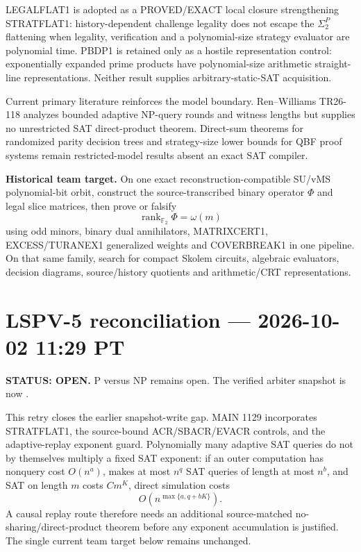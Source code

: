 \documentclass[11pt]{article}
\begin{document}
LEGALFLAT1 is adopted as a PROVED/EXACT local closure strengthening STRATFLAT1: history-dependent
challenge legality does not escape the \(\Sigma_2^P\) flattening when legality, verification and a
polynomial-size strategy evaluator are polynomial time. PBDP1 is retained only as a hostile
representation control: exponentially expanded prime products have polynomial-size arithmetic
straight-line representations. Neither result supplies arbitrary-static-SAT acquisition.

Current primary literature reinforces the model boundary. Ren--Williams TR26-118 analyzes bounded
adaptive NP-query rounds and witness lengths but supplies no unrestricted SAT direct-product theorem.
Direct-sum theorems for randomized parity decision trees and strategy-size lower bounds for QBF
proof systems remain restricted-model results absent an exact SAT compiler.

\begin{candidatebox}
\textbf{Historical team target.}
On one exact reconstruction-compatible SU/vMS polynomial-bit orbit, construct the source-transcribed
binary operator \(\Phi\) and legal slice matrices, then prove or falsify
\[
\operatorname{rank}_{\mathbb F_2}\Phi=\omega(m)
\]
using odd minors, binary dual annihilators, MATRIXCERT1, EXCESS/TURANEX1 generalized weights and
COVERBREAK1 in one pipeline. On that same family, search for compact Skolem circuits, algebraic
evaluators, decision diagrams, source/history quotients and arithmetic/CRT representations.
\end{candidatebox}

\section{LSPV-5 reconciliation --- 2026-10-02 11:29 PT}
\textbf{STATUS: OPEN.} P versus NP remains open. The verified arbiter snapshot is now
.

This retry closes the earlier snapshot-write gap. MAIN 1129 incorporates STRATFLAT1, the source-bound
ACR/SBACR/EVACR controls, and the adaptive-replay exponent guard. Polynomially many adaptive SAT
queries do not by themselves multiply a fixed SAT exponent: if an outer computation has nonquery
cost \(O(n^a)\), makes at most \(n^q\) SAT queries of length at most \(n^b\), and SAT on length
\(m\) costs \(Cm^K\), direct simulation costs
\[
O\!\left(n^{\max\{a,q+bK\}}\right).
\]
A causal replay route therefore needs an additional source-matched no-sharing/direct-product theorem
before any exponent accumulation is justified. The single current team target below remains unchanged.
\end{document}

